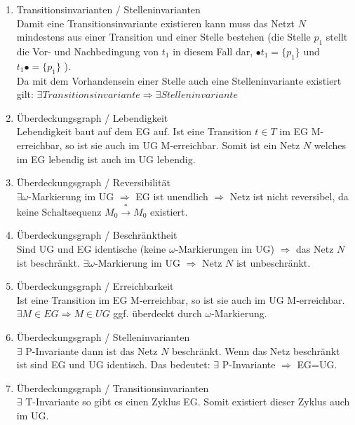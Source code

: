 \documentclass[10pt]{scrartcl}
\begin{document}
\begin{enumerate}
\item{Transitionsinvarianten / Stelleninvarianten}\\
Damit eine Transitionsinvariante existieren kann muss das Netzt $N$ mindestens aus einer Transition und einer Stelle bestehen (die Stelle $p_{1}$ stellt die Vor- und Nachbedingung von $t_{1}$ in diesem Fall dar, $\bullet t_{1} = \{p_{1}\}$ und $t_{1} \bullet = \{p_{1}\}$ ).\\
Da mit dem Vorhandensein einer Stelle auch eine Stelleninvariante existiert gilt: $\exists Transitionsinvariante \Rightarrow \exists Stelleninvariante$

\item{Überdeckungsgraph / Lebendigkeit}\\
Lebendigkeit baut auf dem EG auf. Ist eine Transition $t \in T$ im EG M-erreichbar, so ist sie auch im UG M-erreichbar.
Somit ist ein Netz $N$ welches im EG lebendig ist auch im UG lebendig.

\item{Überdeckungsgraph / Reversibilität}\\
$\exists \omega$-Markierung im UG $\Rightarrow$ EG ist unendlich $\Rightarrow$ Netz ist nicht reversibel, da keine Schaltsequenz $M_{0} \overset{*}{\rightarrow} M_{0}$ existiert.

\item{Überdeckungsgraph / Beschränktheit}\\
Sind UG und EG identische (keine $\omega$-Markierungen im UG) $\Rightarrow$ das Netz $N$ ist beschränkt.
$\exists \omega$-Markierung im UG $\Rightarrow$ Netz $N$ ist unbeschränkt.

\item{Überdeckungsgraph / Erreichbarkeit}\\
Ist eine Transition im EG M-erreichbar, so ist sie auch im UG M-erreichbar. $\exists M \in EG \Rightarrow M \in UG$ ggf. überdeckt durch $\omega$-Markierung.

\item{Überdeckungsgraph / Stelleninvarianten}\\
$\exists$ P-Invariante dann ist das Netz $N$ beschränkt. 
Wenn das Netz beschränkt ist sind EG und UG identisch.
Das bedeutet: $\exists$ P-Invariante $\Rightarrow$ EG=UG.

\item{Überdeckungsgraph / Transitionsinvarianten}\\
$\exists$ T-Invariante so gibt es einen Zyklus EG.
Somit existiert dieser Zyklus auch im UG.


\end{enumerate}
\end{document}
